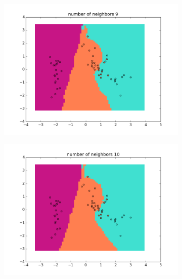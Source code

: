 \documentclass{article}
\begin{document}
\begin{center}
\begin{figure}
\centering  
        \begin{subfigure}[b]{0.48\textwidth}
                \centering
                \includegraphics[width=\linewidth]{figure_10}
        \end{subfigure}\hfill
        \begin{subfigure}[b]{0.48\textwidth}
                \centering
                \includegraphics[width=\linewidth]{figure_11}
        \end{subfigure}
        \label{fig:6}
\end{figure}
\end{center}			 
				
				
				
\end{document}

